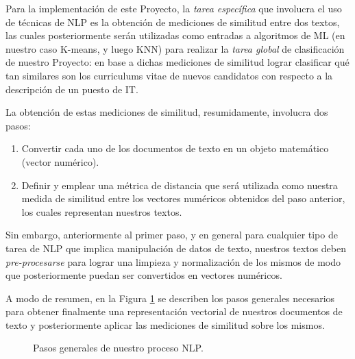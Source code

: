 \documentclass[12pt,a4paper]{article}
\begin{document}
\begin{sloppypar}
Para la implementación de este Proyecto, la \textit{tarea específica} que involucra el uso de técnicas de NLP es la obtención de mediciones de similitud entre dos textos, las cuales posteriormente serán utilizadas como entradas a algoritmos de ML (en nuestro caso K-means, y luego KNN) para realizar la \textit{tarea global} de clasificación de nuestro Proyecto: en base a dichas mediciones de similitud lograr clasificar qué tan similares son los curriculums vitae de nuevos candidatos con respecto a la descripción de un puesto de IT.

La obtención de estas mediciones de similitud, resumidamente, involucra dos pasos\cite{Similarity_calculation}:
\begin{enumerate}
\item Convertir cada uno de los documentos de texto en un objeto matemático (vector numérico).
\item Definir y emplear una métrica de distancia que será utilizada como nuestra medida de similitud entre los vectores numéricos obtenidos del paso anterior, los cuales representan nuestros textos.
\end{enumerate}

Sin embargo, anteriormente al primer paso, y en general para cualquier tipo de tarea de NLP que implica manipulación de datos de texto, nuestros textos deben \textit{pre-procesarse} para lograr una limpieza y normalización de los mismos de modo que posteriormente puedan ser convertidos en vectores numéricos\cite{NLP_2}.

A modo de resumen, en la Figura \ref{fig:Imagen_NLP_1} se describen los pasos generales necesarios para obtener finalmente una representación vectorial de nuestros documentos de texto y posteriormente aplicar las mediciones de similitud sobre los mismos.

\begin{figure}[H]    %
 \centering
 \noindent{}
 \caption{Pasos generales de nuestro proceso NLP.}
 \label{fig:Imagen_NLP_1}
\end{figure}


\end{sloppypar}
\end{document}
